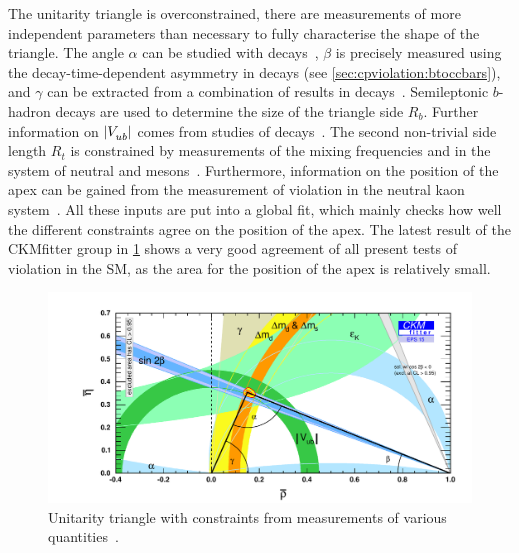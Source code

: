 The unitarity triangle is overconstrained, \ie there are measurements of more
independent parameters than necessary to fully characterise the shape of the
triangle. The angle $\alpha$ can be studied with \BdToPiPi
decays~\cite{BaBar_alpha,Belle_alpha,LHCb-PAPER-2013-040}, $\beta$ is
precisely measured using the decay-time-dependent \CP asymmetry in \BdToJPsiKS
decays (see \cref{sec:cpviolation:btoccbars}), and $\gamma$ can be extracted
from a combination of results in \BToDh decays~\cite{LHCb-CONF-2016-001}.
Semileptonic $b$-hadron decays are used to determine the size of the triangle
side $R_b$. Further information on $|{V_{{u}{b}}^{}}|$ comes from studies of \BuToTauNu
decays~\cite{BaBar_BToTauNu,Belle_BToTauNu_HT,Belle_BToTauNu_SL}. The second
non-trivial side length $R_t$ is constrained by measurements of the mixing
frequencies \dmd and \dms in the system of neutral \Bd and \Bs
mesons~\cite{HFAG}. Furthermore, information on the position of the apex can
be gained from the measurement of \CP violation in the neutral kaon
system~\cite{PDG2016}. All these inputs are put into a global fit, which
mainly checks how well the different constraints agree on the position of the
apex. The latest result of the CKMfitter group in
\cref{fig:cpviolation:ckmtriangle_fitted} shows a very good agreement of all
present tests of \CP violation in the SM, as the area for the position of the
apex is relatively small.
\begin{figure}
\centering
\includegraphics[width=\textwidth]{03-CPViolation/figs/CKMfitterTriangle.pdf}
\caption{Unitarity triangle with constraints from measurements of various
quantities~\cite{CKMfitter}.}
\label{fig:cpviolation:ckmtriangle_fitted}
\end{figure}
